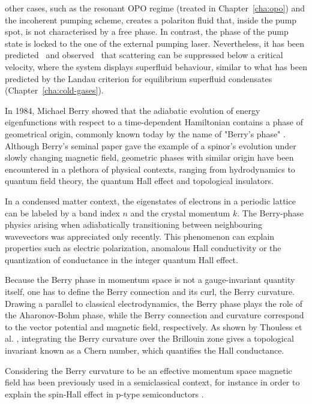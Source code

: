 other cases, such as the resonant OPO regime (treated in
Chapter~\ref{cha:opo}) and the incoherent pumping scheme, creates a
polariton fluid that, inside the pump spot, is not characterised by a
free phase. In contrast, the phase of the pump state is locked to the
one of the external pumping laser. Nevertheless, it has been
predicted~\cite{Carusotto_2004,Ciuti_2005} and
observed~\cite{Amo_2009} that scattering can be suppressed below a
critical velocity, where the system displays superfluid behaviour,
similar to what has been predicted by the Landau criterion for
equilibrium superfluid condensates (Chapter~\ref{cha:cold-gases}).

%

In 1984, Michael Berry showed that the adiabatic evolution of energy
eigenfunctions with respect to a time-dependent Hamiltonian contains a
phase of geometrical origin, commonly known today by the name of
"Berry's phase" \cite{Berry_1984}.  Although Berry's seminal paper gave
the example of a spinor's evolution under slowly changing magnetic
field, geometric phases \cite{shapere1989geometric} with similar
origin have been encountered in a plethora of physical contexts,
ranging from hydrodynamics to quantum field theory, the quantum Hall
effect and topological insulators.

In a condensed matter context, the eigenstates of electrons in a
periodic lattice can be labeled by a band index $n$ and the crystal
momentum $k$. The Berry-phase physics arising when adiabatically
transitioning between neighbouring wavevectors was appreciated only
recently. This phenomenon can explain properties such as electric
polarization, anomalous Hall conductivity or the quantization of
conductance in the integer quantum Hall effect.

Because the Berry phase in momentum space is not a gauge-invariant
quantity itself, one has to define the Berry connection and its curl,
the Berry curvature.  Drawing a parallel to classical electrodynamics,
the Berry phase plays the role of the Aharonov-Bohm phase, while the
Berry connection and curvature correspond to the vector potential and
magnetic field, respectively.  As shown by Thouless et
al. \cite{Thouless_1982}, integrating the Berry curvature over the
Brillouin zone gives a topological invariant known as a Chern number,
which quantifies the Hall conductance.

Considering the Berry curvature to be an effective momentum space
magnetic field has been previously used in a semiclassical context,
for instance in order to explain the spin-Hall effect in p-type
semiconductors \cite{murakami2003dissipationless}.


